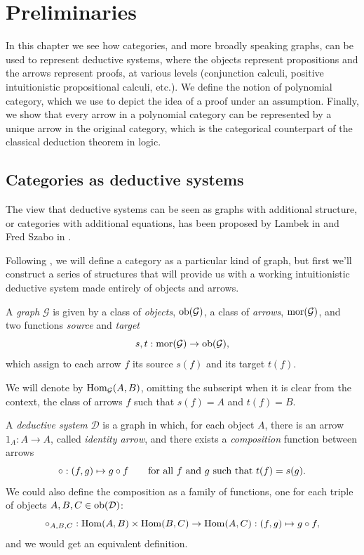 \chapter{Preliminaries}
In this chapter we see how categories, and more broadly speaking graphs, can be used to represent deductive systems, where the objects represent propositions and the arrows represent proofs, at various levels (conjunction calculi, positive intuitionistic propositional calculi, etc.).
We define the notion of polynomial category, which we use to depict the idea of a proof under an assumption. Finally, we show that every arrow
in a polynomial category can be represented by a unique arrow in the original category, which is the categorical counterpart of the classical deduction theorem in logic.

\section{Categories as deductive systems}
The view that deductive systems can be seen as graphs with additional structure, or categories with additional equations, has been proposed by Lambek in \cite{Lambek1968,Lambek1969,Lambek1972} and Fred Szabo in \cite{Szabo1974b,Szabo1978}.

Following \cite{LambekScott1994}, we will define a category as a particular kind of graph, but first we'll construct a series of structures that will provide us
with a working intuitionistic deductive system made entirely of objects and arrows.

\begin{definition}[Graph]\label{idx:graph}
    A \emph{graph} $\mathcal G$ is given by a class of \emph{objects}, $\operatorname{ob}(\mathcal G)$, a class of \emph{arrows}, $\operatorname{mor}(\mathcal G)$, and two functions
    \emph{source} and \emph{target}
    \[ s,t:\operatorname{mor}(\mathcal G)\to\operatorname{ob}(\mathcal G),\]
    which assign to each arrow $f$ its source $s(f)$ and its target $t(f)$.
\end{definition}

\begin{notation}
    We will denote by $\operatorname{Hom}_{\mathcal G}(A,B)$, omitting the subscript when it is clear from the context, the class of arrows $f$ such that $s(f)=A$ and $t(f)=B$.\label{idx:hom}
\end{notation}

\begin{definition}
    A \emph{deductive system} $\mathcal D$ is a graph in which, for each object $A$, there is an arrow $1_A : A \to A$, called \emph{identity arrow}, and there exists a
    \emph{composition} function between arrows
    \[ \circ : (f,g) \mapsto g \circ f \qquad \textnormal{for all $f$ and $g$ such that $t(f)=s(g)$.} \]
    We could also define the composition as a family of functions, one for each triple of objects $A,B,C \in \operatorname{ob}(\mathcal D)$:
    \[ \circ_{A,B,C} : \operatorname{Hom}(A,B) \times \operatorname{Hom}(B,C) \to \operatorname{Hom}(A,C) : (f,g) \mapsto g \circ f, \]
    and we would get an equivalent definition.
\end{definition}

